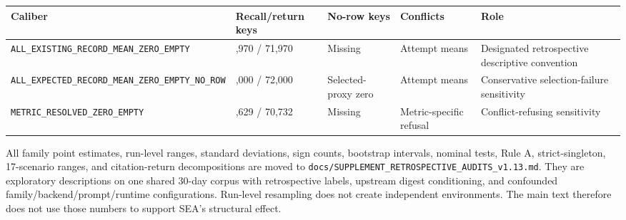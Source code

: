 \documentclass[
  11pt]{article}
\begin{document}
\begin{longtable}[]{@{}
  >{\raggedright\arraybackslash}p{}
  >{\raggedleft\arraybackslash}p{}
  >{\raggedright\arraybackslash}p{}
  >{\raggedright\arraybackslash}p{}
  >{\raggedright\arraybackslash}p{}@{}}
\toprule\noalign{}
\begin{minipage}[b]{\linewidth}\raggedright
Caliber
\end{minipage} & \begin{minipage}[b]{\linewidth}\raggedleft
Recall/return keys
\end{minipage} & \begin{minipage}[b]{\linewidth}\raggedright
No-row keys
\end{minipage} & \begin{minipage}[b]{\linewidth}\raggedright
Conflicts
\end{minipage} & \begin{minipage}[b]{\linewidth}\raggedright
Role
\end{minipage} \\
\midrule\noalign{}
\endhead
\bottomrule\noalign{}
\endlastfoot
\texttt{ALL\_EXISTING\_}\allowbreak \texttt{RECORD\_MEAN\_}\allowbreak \texttt{ZERO\_EMPTY}
& 71,970 / 71,970 & Missing & Attempt means & Designated retrospective
descriptive convention \\
\texttt{ALL\_EXPECTED\_}\allowbreak \texttt{RECORD\_MEAN\_}\allowbreak \texttt{ZERO\_EMPTY\_}\allowbreak \texttt{NO\_ROW}
& 72,000 / 72,000 & Selected-proxy zero & Attempt means & Conservative
selection-failure sensitivity \\
\texttt{METRIC\_RESOLVED\_}\allowbreak \texttt{ZERO\_EMPTY} & 71,629 /
70,732 & Missing & Metric-specific refusal & Conflict-refusing
sensitivity \\
\end{longtable}

All family point estimates, run-level ranges, standard deviations, sign
counts, bootstrap intervals, nominal tests, Rule A, strict-singleton,
17-scenario ranges, and citation-return decompositions are moved to
\texttt{docs/SUPPLEMENT\_RETROSPECTIVE\_AUDITS\_v1.13.md}. They are
exploratory descriptions on one shared 30-day corpus with retrospective
labels, upstream digest conditioning, and confounded
family/backend/prompt/runtime configurations. Run-level resampling does
not create independent environments. The main text therefore does not
use those numbers to support SEA's structural effect.
\end{document}

